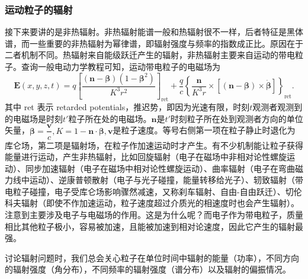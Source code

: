 \documentclass[../天体物理基础.tex]{subfiles}
\begin{document}
\subsubsection{运动粒子的辐射}
接下来要讲的是非热辐射。非热辐射能谱一般和热辐射很不一样，后者特征是黑体谱，而一些重要的非热辐射为幂律谱，即辐射强度与频率的指数成正比。原因在于二者机制不同。热辐射来自能级跃迁产生的辐射，非热辐射主要来自运动的带电粒子。查询一般电动力学教程可知，运动带电粒子的电磁场为
\begin{equation}
\boldsymbol{E}\left(x,y,z,t\right)=q\left[\frac{\left(\boldsymbol{n}-\boldsymbol{\beta}\right)\left(1-\boldsymbol{\beta}^{2}\right)}{K^{3}r^{2}}\right]_{\text{ret}}+\frac{q}{c}\left\{\frac{\boldsymbol{n}}{K^{3}r}\times\left[\left(\boldsymbol{n}-\boldsymbol{\beta}\right)\times\dot{\boldsymbol{\beta}}\right]\right\}_{\text{ret}}.\label{1.3.38}
\end{equation}
其中 ret 表示 retarded potentials，推迟势，即因为光速有限，时刻$t$观测者观测到的电磁场是时刻$t'$粒子所在处的电磁场。$\boldsymbol{n}$是$t'$时刻粒子所在处到观测者方向的单位矢量，$\boldsymbol{\beta}=\dfrac{\boldsymbol{v}}{c},K=1-\boldsymbol{n}\cdot\boldsymbol{\beta},\boldsymbol{v}$是粒子速度。等号右侧第一项在粒子静止时退化为库仑场，第二项是辐射场，在粒子作加速运动时才产生。有不少机制能让粒子获得能量进行运动，产生非热辐射，比如回旋辐射（电子在磁场中非相对论性螺旋运动）、同步加速辐射（电子在磁场中相对论性螺旋运动）、曲率辐射（电子在弯曲磁力线中运动）、逆康普顿散射（电子与光子碰撞，能量转移给光子）、轫致辐射（带电粒子碰撞，电子受库仑场影响骤然减速，又称刹车辐射、自由{}-{}自由跃迁）、切伦科夫辐射（即使不作加速运动，粒子速度超过介质光的相速度时也会产生辐射）。注意到主要涉及电子与电磁场的作用。这是为什么呢？而电子作为带电粒子，质量相比其他粒子极小，容易被加速，且能被加速到相对论速度，因此它产生的辐射最强。

讨论辐射问题时，我们总会关心粒子在单位时间中辐射的能量（功率），不同方向的辐射强度（角分布），不同频率的辐射强度（谱分布）以及辐射的偏振情况。
\end{document}
